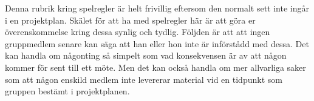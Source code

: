 \documentclass[a4paper]{article}
\begin{document}
Denna rubrik kring spelregler är helt frivillig eftersom den normalt
sett inte ingår i en projektplan. Skälet för att ha med spelregler här
är att göra er överenskommelse kring dessa synlig och tydlig. Följden är
att att ingen gruppmedlem senare kan säga att han eller hon inte är
införstådd med dessa. Det kan handla om någonting så simpelt som vad
konsekvensen är av att någon kommer för sent till ett möte. Men det kan
också handla om mer allvarliga saker som att någon enskild medlem inte
levererar material vid en tidpunkt som gruppen bestämt i projektplanen.



\end{document}
